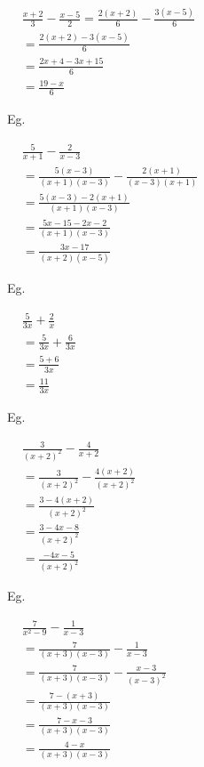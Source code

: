 \documentclass[twocolumn]{article}
\begin{document}
\noindent 
$
\begin{aligned}
	& \frac{x+2}{3}-\frac{x-5}{2}=\frac{2(x+2)}{6}-\frac{3(x-5)}{6} \\	
	& =\frac{2(x+2)-3(x-5)}{6} \\
	& =\frac{2 x+4-3 x+15}{6} \\
	& =\frac{19-x}{6}
\end{aligned}
$

\bigskip 

\noindent 
Eg.

\noindent 
$
\begin{aligned}
	& \frac{5}{x+1}-\frac{2}{x-3} \\
	& =\frac{5(x-3)}{(x+1)(x-3)}-\frac{2(x+1)}{(x-3)(x+1)} \\
	& =\frac{5(x-3)-2(x+1)}{(x+1)(x-3)} \\
	& =\frac{5 x-15-2 x-2}{(x+1)(x-3)} \\
	& =\frac{3 x-17}{(x+2)(x-5)}
\end{aligned}
$

\bigskip 

\noindent 
Eg.

\noindent 
$
\begin{aligned}
	& \frac{5}{3 x}+\frac{2}{x} \\
	& = \frac{5}{3 x}+\frac{6}{3x} \\
	& =\frac{5+6}{3 x} \\
	& =\frac{11}{3 x}
\end{aligned}
$

\bigskip 

\noindent 
Eg. 

\noindent 
$
\begin{aligned}
	& \frac{3}{(x+2)^2}-\frac{4}{x+2} \\
	& =\frac{3}{(x+2)^2}-\frac{4(x+2)}{(x+2)^2} \\	
	& =\frac{3-4(x+2)}{(x+2)^2} \\
	& =\frac{3-4 x-8}{(x+2)^2} \\
	& =\frac{-4 x-5}{(x+2)^2}
\end{aligned}
$

\bigskip 

\noindent 
Eg. 

\noindent 
$
\begin{aligned}
	& \frac{7}{x^2-9}-\frac{1}{x-3} \\
	& =\frac{7}{(x+3)(x-3)}-\frac{1}{x-3} \\
	& =\frac{7}{(x+3)(x-3)}-\frac{x-3}{(x-3)^2} \\	
	& =\frac{7-(x+3)}{(x+3)(x-3)} \\
	& =\frac{7-x-3}{(x+3)(x-3)} \\
	& =\frac{4-x}{(x+3)(x-3)}
\end{aligned}
$
\end{document}
